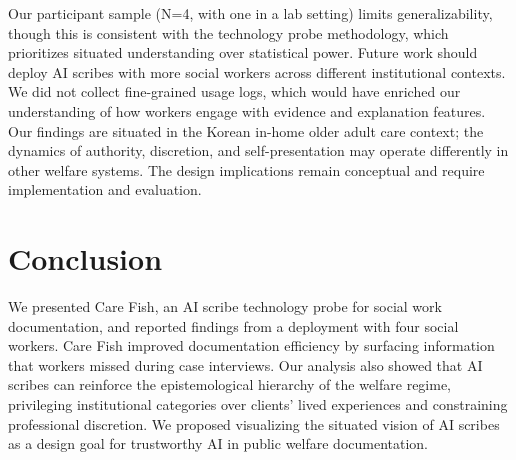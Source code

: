\documentclass{article}
\begin{document}
Our participant sample (N=4, with one in a lab setting) limits generalizability, though this is consistent with the technology probe methodology, which prioritizes situated understanding over statistical power. Future work should deploy AI scribes with more social workers across different institutional contexts. We did not collect fine-grained usage logs, which would have enriched our understanding of how workers engage with evidence and explanation features. Our findings are situated in the Korean in-home older adult care context; the dynamics of authority, discretion, and self-presentation may operate differently in other welfare systems. The design implications remain conceptual and require implementation and evaluation.

\section{Conclusion}

We presented Care Fish, an AI scribe technology probe for social work documentation, and reported findings from a deployment with four social workers. Care Fish improved documentation efficiency by surfacing information that workers missed during case interviews. Our analysis also showed that AI scribes can reinforce the epistemological hierarchy of the welfare regime, privileging institutional categories over clients' lived experiences and constraining professional discretion. We proposed visualizing the situated vision of AI scribes as a design goal for trustworthy AI in public welfare documentation.



\end{document}
